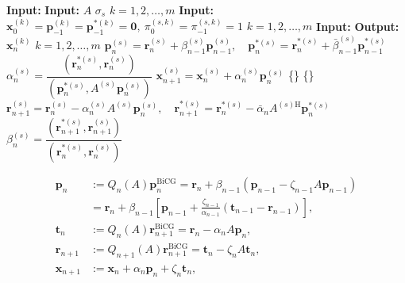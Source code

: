 \begin{algorithm}[H]\caption{}\label{alg:shifted-bicg}\begin{algorithmic}[1]
\Statex\textbf{Input:} 
\Statex\textbf{Input:} $A$  $\sigma_s$  $k=1,2,\ldots,m$
\Statex\textbf{Input:} $\bm x_0^{(k)}=\bm p_{-1}^{(k)}=\bm p_{-1}^{*(k)}=\bm0,\ \pi_0^{(s,k)}=\pi_{-1}^{(s,k)}=1$  $k=1,2,\ldots,m$
\Statex\textbf{Input:} 
\Statex\textbf{Output:} $\bm x_n^{(k)}$  $k=1,2,\ldots,m$
\State $\bm p_n^{(s)}=\bm r_n^{(s)}+\beta_{n-1}^{(s)}\bm p_{n-1}^{(s)},\quad\bm p_n^{*(s)}=\bm r_n^{*(s)}+\bar\beta_{n-1}^{(s)}\bm p_{n-1}^{*(s)}$
\State $\alpha_n^{(s)}=\dfrac{(\bm r_n^{*(s)},\bm r_n^{(s)})}{(\bm p_n^{*(s)},A^{(s)}\bm p_n^{(s)})}$
\State $\bm x_{n+1}^{(s)}=\bm x_n^{(s)}+\alpha_n^{(s)}\bm p_n^{(s)}$
\State \{\}
\State {}
\State \{\}
\State $\bm r_{n+1}^{(s)}=\bm r_n^{(s)}-\alpha_n^{(s)}A^{(s)}\bm p_n^{(s)},\quad\bm r_{n+1}^{*(s)}=\bm r_n^{*(s)}-\bar\alpha_nA^{(s)\mathrm H}\bm p_n^{*(s)}$
\State $\beta_n^{(s)}=\dfrac{(\bm r_{n+1}^{*(s)},\bm r_{n+1}^{(s)})}{(\bm r_n^{*(s)},\bm r_n^{(s)})}$
\EndFor\end{algorithmic}\end{algorithm}
\[\begin{aligned}\bm p_n&:=Q_n(A)\bm p_n^{\mathrm{BiCG}}=\bm r_n+\beta_{n-1}(\bm p_{n-1}-\zeta_{n-1}A\bm p_{n-1})\\&=\bm r_n+\beta_{n-1}\left[\bm p_{n-1}+\frac{\zeta_{n-1}}{\alpha_{n-1}}(\bm t_{n-1}-\bm r_{n-1})\right],\\
\bm t_n&:=Q_n(A)\bm r_{n+1}^{\mathrm{BiCG}}=\bm r_n-\alpha_nA\bm p_n,\\
\bm r_{n+1}&:=Q_{n+1}(A)\bm r_{n+1}^{\mathrm{BiCG}}=\bm t_n-\zeta_nA\bm t_n,\\
\bm x_{n+1}&:=\bm x_n+\alpha_n\bm p_n+\zeta_n\bm t_n,\end{aligned}\]
